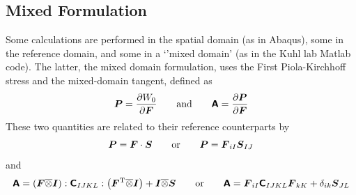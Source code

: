\documentclass[10pt,letterpaper,oneside]{report}
\newcommand{\ten}[1]{\mbox{\boldmath $#1$}{}}
\newcommand{\tenf}[1]{\mbox{{\sffamily{\bfseries {#1}}}}}
\newcommand{\scas}[1]{\mbox{{\scriptsize{${\rm{#1}}$}}}{}}
\begin{document}
\begin{itemize}



\section{Mixed Formulation}
Some calculations are performed in the spatial domain (as in Abaqus), some in the reference domain, and some in a `'mixed domain' (as in the Kuhl lab Matlab code).  The latter, the mixed domain formulation, uses the First Piola-Kirchhoff stress 
and the mixed-domain tangent, defined as
\begin{equation}
\ten{P} = \frac{ \partial W_0 }{ \partial \ten{F} }
\qquad \mbox{and} \qquad
\tenf{A} = \frac{ \partial \ten{P} }{ \partial \ten{F} }
\end{equation}
These two quantities are related to their reference counterparts by 
\begin{equation}
\ten{P} = \ten{F} \cdot \ten{S} 
\qquad \mbox{or} \qquad
\ten{P} = \ten{F}_{iI} \ten{S}_{IJ}
\end{equation}
and
\begin{equation}
\tenf{A} = \left( \ten{F} \overline{\otimes} \ten{I} \right) : \tenf{C}_{IJKL} : \left( \ten{F}^{\scas{T}} \overline{\otimes} \ten{I} \right) + \ten{I} \overline{\otimes} \ten{S} 
\qquad \mbox{or} \qquad
\tenf{A} = \ten{F}_{iI} \tenf{C}_{IJKL} \ten{F}_{kK} + \delta_{ik} \ten{S}_{JL}
\end{equation}



\end{itemize}
\end{document}
